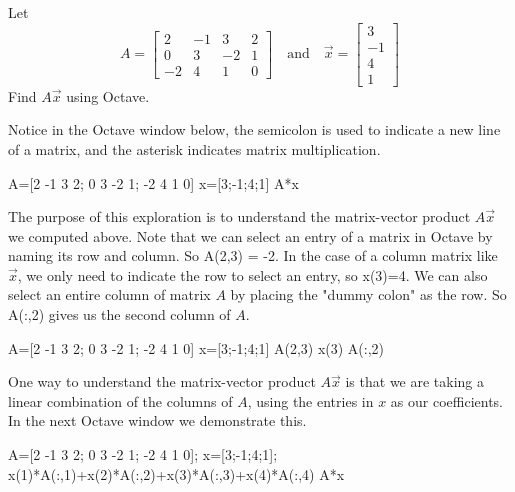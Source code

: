 \documentclass{ximera}
\begin{document}
\begin{exploration}\label{exp:matrixvectormultdef} Let $$A=\begin{bmatrix}2&-1&3&2\\0&3&-2&1\\-2&4&1&0\end{bmatrix}\quad\text{and}\quad \vec{x}=\begin{bmatrix}3\\-1\\4\\1\end{bmatrix}$$ Find $A\vec{x}$ using Octave.

Notice in the Octave window below, the semicolon is used to indicate a new line of a matrix, and the asterisk indicates matrix multiplication.

A=[2 -1 3 2; 0 3 -2 1; -2 4 1 0]
x=[3;-1;4;1]
A*x

The purpose of this exploration is to understand the matrix-vector product $A\vec{x}$ we computed above.  Note that we can select an entry of a matrix in Octave by naming its row and column.  So A(2,3) = -2.  In the case of a column matrix like $\vec{x}$, we only need to indicate the row to select an entry, so x(3)=4.  We can also select an entire column of matrix $A$ by placing the "dummy colon" as the row.  So A(:,2) gives us the second column of $A$.

A=[2 -1 3 2; 0 3 -2 1; -2 4 1 0]
x=[3;-1;4;1]
A(2,3)
x(3)
A(:,2)

One way to understand the matrix-vector product $A\vec{x}$ is that we are taking a linear combination of the columns of $A$, using the entries in $x$ as our coefficients.  In the next Octave window we demonstrate this.  

A=[2 -1 3 2; 0 3 -2 1; -2 4 1 0];
x=[3;-1;4;1]; %
x(1)*A(:,1)+x(2)*A(:,2)+x(3)*A(:,3)+x(4)*A(:,4)
A*x


\end{exploration}
\end{document}
